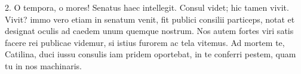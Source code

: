 {  %
  2. O tempora, o mores! Senatus haec intellegit. Consul videt; hic tamen vivit. Vivit? immo vero etiam in senatum venit, fit publici consilii particeps, notat et designat oculis ad caedem unum quemque nostrum. Nos autem fortes viri satis facere rei publicae videmur, si istius furorem ac tela vitemus. Ad mortem te, Catilina, duci iussu consulis iam pridem oportebat, in te conferri pestem, quam tu in nos machinaris. 

}
